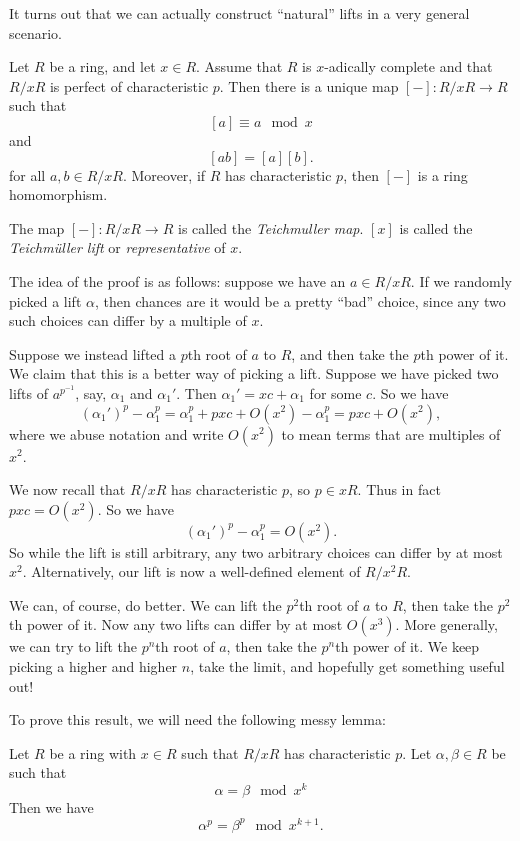 \documentclass[a4paper]{article}
\begin{document}
It turns out that we can actually construct ``natural'' lifts in a very general scenario.
\begin{thm}
  Let $R$ be a ring, and let $x \in R$. Assume that $R$ is $x$-adically complete and that $R/xR$ is perfect of characteristic $p$. Then there is a unique map $[-]: R/xR \to R$ such that
  \[
    [a] \equiv a \mod x
  \]
  and
  \[
    [ab] = [a][b].
  \]
  for all $a, b \in R/xR$. Moreover, if $R$ has characteristic $p$, then $[-]$ is a ring homomorphism.
\end{thm}

\begin{defi}
  The map $[-]: R/xR \to R$ is called the \emph{Teichm\:uller map}. $[x]$ is called the \emph{Teichm\"uller lift} or \emph{representative} of $x$.
\end{defi}

The idea of the proof is as follows: suppose we have an $a \in R/xR$. If we randomly picked a lift $\alpha$, then chances are it would be a pretty ``bad'' choice, since any two such choices can differ by a multiple of $x$.

Suppose we instead lifted a $p$th root of $a$ to $R$, and then take the $p$th power of it. We claim that this is a better way of picking a lift. Suppose we have picked two lifts of $a^{p^{-1}}$, say, $\alpha_1$ and $\alpha_1'$. Then $\alpha_1' = xc + \alpha_1$ for some $c$. So we have
\[
  (\alpha_1')^p - \alpha_1^p = \alpha_1^p + pxc + O(x^2) - \alpha_1^p = pxc + O(x^2),
\]
where we abuse notation and write $O(x^2)$ to mean terms that are multiples of $x^2$.

We now recall that $R/xR$ has characteristic $p$, so $p \in xR$. Thus in fact $pxc = O(x^2)$. So we have
\[
  (\alpha_1')^p - \alpha_1^p = O(x^2).
\]
So while the lift is still arbitrary, any two arbitrary choices can differ by at most $x^2$. Alternatively, our lift is now a well-defined element of $R/x^2 R$.

We can, of course, do better. We can lift the $p^2$th root of $a$ to $R$, then take the $p^2$th power of it. Now any two lifts can differ by at most $O(x^3)$. More generally, we can try to lift the $p^n$th root of $a$, then take the $p^n$th power of it. We keep picking a higher and higher $n$, take the limit, and hopefully get something useful out!

To prove this result, we will need the following messy lemma:
\begin{lemma}
  Let $R$ be a ring with $x \in R$ such that $R/xR$ has characteristic $p$. Let $\alpha, \beta \in R$ be such that
  \[
    \alpha = \beta \mod x^k\tag{$\dagger$}
  \]
  Then we have
  \[
    \alpha^p = \beta^p \mod x^{k + 1}.
  \]
\end{lemma}
\end{document}
